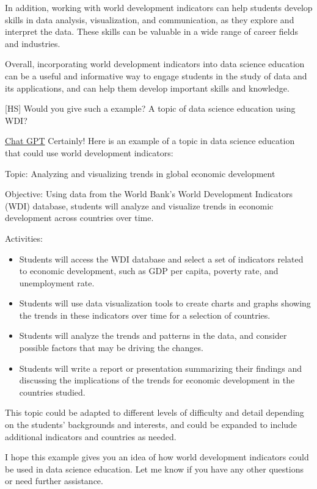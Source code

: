 \documentclass[
]{book}
\providecommand{\tightlist}{%
  \setlength{\itemsep}{0pt}\setlength{\parskip}{0pt}}
\theoremstyle{definition}
\theoremstyle{definition}
\theoremstyle{definition}
\theoremstyle{definition}
\theoremstyle{remark}
\begin{document}
In addition, working with world development indicators can help students develop skills in data analysis, visualization, and communication, as they explore and interpret the data. These skills can be valuable in a wide range of career fields and industries.

Overall, incorporating world development indicators into data science education can be a useful and informative way to engage students in the study of data and its applications, and can help them develop important skills and knowledge.

{[}HS{]} Would you give such a example? A topic of data science education using WDI?

\protect\hyperlink{chatgpt}{Chat GPT} Certainly! Here is an example of a topic in data science education that could use world development indicators:

Topic: Analyzing and visualizing trends in global economic development

Objective: Using data from the World Bank's World Development Indicators (WDI) database, students will analyze and visualize trends in economic development across countries over time.

Activities:

\begin{itemize}
\tightlist
\item
  Students will access the WDI database and select a set of indicators related to economic development, such as GDP per capita, poverty rate, and unemployment rate.
\item
  Students will use data visualization tools to create charts and graphs showing the trends in these indicators over time for a selection of countries.
\item
  Students will analyze the trends and patterns in the data, and consider possible factors that may be driving the changes.
\item
  Students will write a report or presentation summarizing their findings and discussing the implications of the trends for economic development in the countries studied.
\end{itemize}

This topic could be adapted to different levels of difficulty and detail depending on the students' backgrounds and interests, and could be expanded to include additional indicators and countries as needed.

I hope this example gives you an idea of how world development indicators could be used in data science education. Let me know if you have any other questions or need further assistance.
\end{document}
